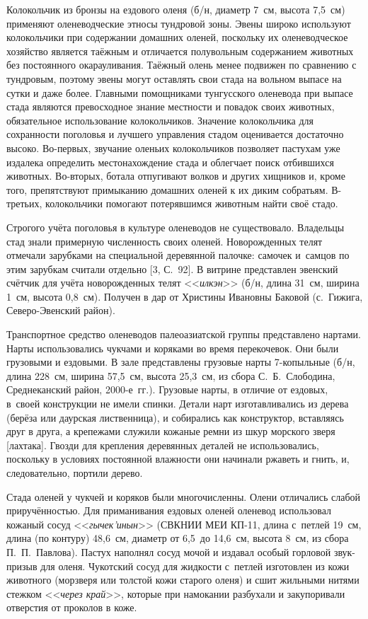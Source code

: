 Колокольчик из бронзы на ездового оленя (б/н, диаметр 7~см, высота 7,5~см) применяют оленеводческие этносы тундровой зоны. Эвены широко используют колокольчики при содержании домашних оленей, поскольку их оленеводческое хозяйство является таёжным и отличается полувольным содержанием животных без постоянного окарауливания. Таёжный олень менее подвижен по сравнению с тундровым, поэтому эвены могут оставлять свои стада на вольном выпасе на сутки и даже более. Главными помощниками тунгусского оленевода при выпасе стада являются превосходное знание местности и повадок своих животных, обязательное использование колокольчиков. Значение колокольчика для сохранности поголовья и лучшего управления стадом оценивается достаточно высоко. Во-первых, звучание оленьих колокольчиков позволяет пастухам уже издалека определить местонахождение стада и облегчает поиск отбившихся животных. Во-вторых, ботала отпугивают волков и других хищников и, кроме того, препятствуют примыканию домашних оленей к их диким собратьям. В-третьих, колокольчики помогают потерявшимся животным найти своё стадо.

Строгого учёта поголовья в культуре оленеводов не существовало. Владельцы стад знали примерную численность своих оленей. Новорожденных телят отмечали зарубками на специальной деревянной палочке: самочек и~самцов по этим зарубкам считали отдельно [3, С.~92]. В витрине представлен эвенский счётчик для учёта новорожденных телят <<\textit{илкэн}>> (б/н, длина 31~см, ширина 1~см, высота 0,8~см). Получен в дар от Христины Ивановны Баковой (с.~Гижига, Северо-Эвенский район).

Транспортное средство оленеводов палеоазиатской группы представлено нартами. Нарты использовались чукчами и коряками во время перекочевок. Они были грузовыми и ездовыми. В зале представлены грузовые нарты 7-копыльные (б/н, длина 228~см, ширина 57,5~см, высота 25,3~см, из сбора С.~Б.~Слободина, Среднеканский район, 2000-е~гг.). Грузовые нарты, в отличие от ездовых, в~своей конструкции не имели спинки. Детали нарт изготавливались из дерева (берёза или даурская лиственница), и собирались как конструктор, вставляясь друг в друга, а крепежами служили кожаные ремни из шкур морского зверя [лахтака]. Гвозди для крепления деревянных деталей не использовались, поскольку в условиях постоянной влажности они начинали ржаветь и гнить, и, следовательно, портили дерево.

Стада оленей у чукчей и коряков были многочисленны. Олени отличались слабой приручённостью. Для приманивания ездовых оленей оленевод использовал кожаный сосуд <<\textit{гычек'инын}>> (СВКНИИ МЕИ КП-11, длина с~петлей 19~см, длина (по контуру) 48,6~см, диаметр от 6,5~до 14,6~см, высота 8~см, из сбора П.~П.~Павлова). Пастух наполнял сосуд мочой и издавал особый горловой звук-призыв для оленя. Чукотский сосуд для жидкости с~петлей изготовлен из кожи животного (морзверя или толстой кожи старого оленя) и сшит жильными нитями стежком <<\textit{через край}>>, которые при намокании разбухали и закупоривали отверстия от проколов в коже.

